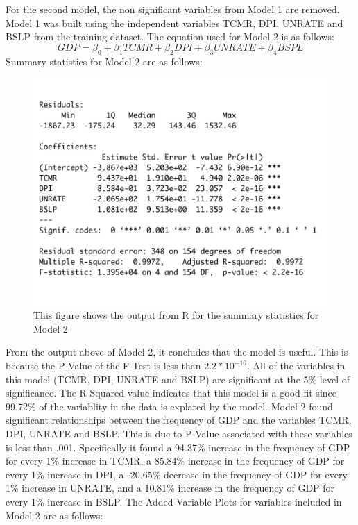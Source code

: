 \documentclass[12pt]{article}
\begin{document}
For the second model, the non significant variables from Model 1 are removed. 
Model 1 was built using the independent variables TCMR, DPI, UNRATE and BSLP from the training dataset. 
The equation used for Model 2 is as follows:
\begin{equation}
  GDP = \beta_0 + \beta_1TCMR+ \beta_2 DPI + \beta_3 UNRATE + \beta_4 BSPL
\end{equation}
Summary statistics for Model 2 are as follows:
\begin{figure}[H]
  \centering
  \includegraphics[scale = .35]{mod2output}
  \caption{This figure shows the output from R for the summary statistics for Model 2}
\end{figure}
From the output above of Model 2, it concludes that the model is useful.
This is because the P-Value of the F-Test is less than $2.2 * 10^{-16}$.
All of the variables in this model (TCMR, DPI, UNRATE and BSLP) are significant at the 5\% level of significance.
The R-Squared value indicates that this model is a good fit since 99.72\% of the variablity in the data is explated by the model. 
Model 2 found significant relationships between the frequency of GDP and the variables TCMR, DPI, UNRATE and BSLP. 
This is due to P-Value associated with these variables is less than .001. 
Specifically it found a 94.37\% increase in the frequency of GDP for every 1\% increase in TCMR, a 85.84\% increase in the frequency of GDP for every 1\% increase in DPI, a -20.65\% decrease in the frequency of GDP for every 1\% increase in UNRATE, and a 10.81\% increase in the frequency of GDP for every 1\% increase in BSLP.
The Added-Variable Plots for variables included in Model 2 are as follows: 
\end{document}
